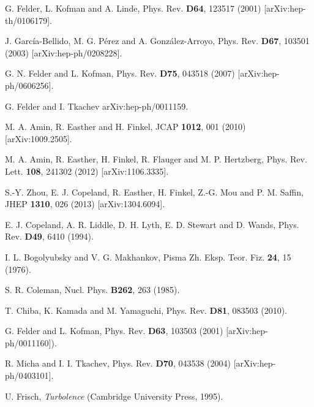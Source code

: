 \documentclass[11pt,a4paper,twoside]{book}
\begin{document}
\begin{thebibliography}{2}
	 G. Felder, L. Kofman and A. Linde, Phys. Rev. \textbf{D64}, 123517 (2001) [arXiv:hep-th/0106179].
	
	 J. Garc\'{i}a-Bellido, M. G. P\'{e}rez and A. Gonz\'{a}lez-Arroyo, Phys. Rev. \textbf{D67}, 103501 (2003) [arXiv:hep-ph/0208228].
	
	 G. N. Felder and L. Kofman, Phys. Rev. \textbf{D75}, 043518 (2007) [arXiv:hep-ph/0606256].
	
	 G. Felder and I. Tkachev arXiv:hep-ph/0011159.
	
	 M. A. Amin, R. Easther and H. Finkel, JCAP \textbf{1012}, 001 (2010) [arXiv:1009.2505].
	
	 M. A. Amin, R. Easther, H. Finkel, R. Flauger and M. P. Hertzberg, Phys. Rev. Lett. \textbf{108}, 241302 (2012) [arXiv:1106.3335].
	
	 S.-Y. Zhou, E. J. Copeland, R. Easther, H. Finkel, Z.-G. Mou and P. M. Saffin, JHEP \textbf{1310}, 026 (2013) [arXiv:1304.6094].
	
	 E. J. Copeland, A. R. Liddle, D. H. Lyth, E. D. Stewart and D. Wands, Phys. Rev. \textbf{D49}, 6410 (1994).
	
	 I. L. Bogolyubsky and V. G. Makhankov, Pisma Zh. Eksp. Teor. Fiz. \textbf{24}, 15 (1976).

	 S. R. Coleman, Nucl. Phys. \textbf{B262}, 263 (1985). 	

	T. Chiba, K. Kamada and M. Yamaguchi, Phys. Rev. \textbf{D81}, 083503 (2010).	
	
	 G. Felder and L. Kofman, Phys. Rev. \textbf{D63}, 103503 (2001) [arXiv:hep-ph/0011160]).
	
	 R. Micha and I. I. Tkachev, Phys. Rev. \textbf{D70}, 043538 (2004) [arXiv:hep-ph/0403101].
	
	 U. Frisch, \textit{Turbolence} (Cambridge University Press, 1995).
	
\end{thebibliography}	
	
\end{document}
